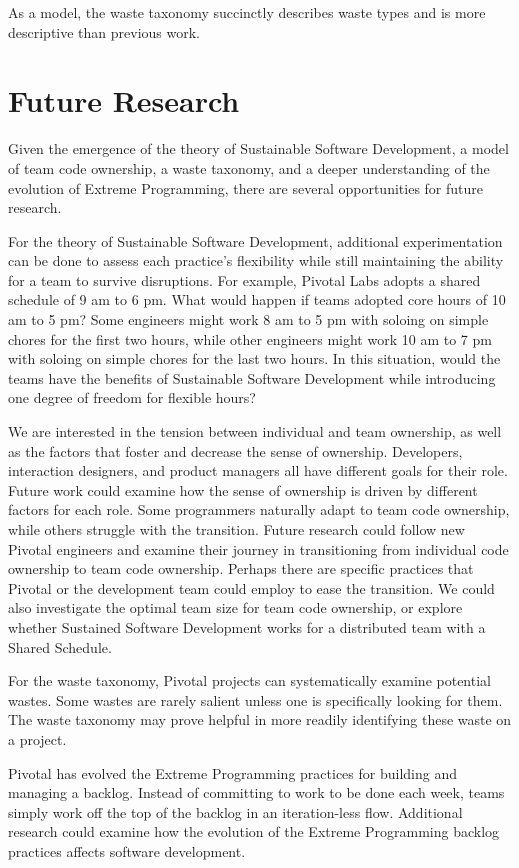 As a model, the waste taxonomy succinctly describes waste types and is more descriptive than previous work. 


\section{Future Research}
Given the emergence of the theory of Sustainable Software Development, a model of team code ownership, a waste taxonomy, and a deeper understanding of the evolution of Extreme Programming, there are several opportunities for future research.


For the theory of Sustainable Software Development, additional experimentation can be done to assess each practice's flexibility
while still maintaining the ability for a team to survive disruptions. For example, Pivotal Labs adopts a shared schedule of 9 am to 6 pm. What would happen if teams adopted core hours of 10 am to 5 pm? Some engineers might work 8 am to 5 pm with soloing on simple chores for the first two hours, while other engineers might work 10 am to 7 pm with soloing on simple chores for the last two hours. In this situation, would the teams have the benefits of Sustainable Software Development while introducing one degree of freedom for flexible hours?


We are interested in the tension between individual and team ownership, as well as the factors that foster and decrease the sense of ownership. Developers, interaction designers, and product managers all have different goals for their role. Future work could examine how the sense of ownership is driven by different factors for each role. Some programmers naturally adapt to team code ownership, while others struggle with the transition. Future research could follow new Pivotal engineers and examine their journey in transitioning from individual code ownership to team code ownership. Perhaps there are specific practices that Pivotal or the development team could employ to ease the transition. We could also investigate the optimal team size for team code ownership, or explore whether Sustained Software Development works for a distributed team with a Shared Schedule.


For the waste taxonomy, Pivotal projects can systematically examine potential wastes. Some wastes are rarely salient unless one is specifically looking for them. The waste taxonomy may prove helpful in more readily identifying these waste on a project. 


Pivotal has evolved the Extreme Programming practices for building and managing a backlog. Instead of committing to work to be done each week, teams simply work off the top of the backlog in an iteration-less flow. Additional research could examine how the evolution of the Extreme Programming backlog practices affects software development.


